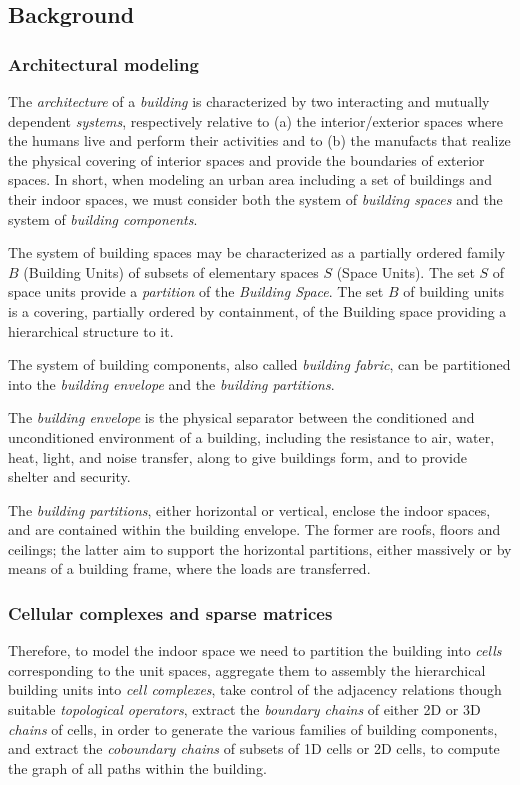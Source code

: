 \documentclass[]{egpubl}
\begin{document}
\subsection{Background}

\subsubsection*{Architectural modeling} 
The \emph{architecture} of a \emph{building} is characterized by two interacting and mutually dependent \emph{systems}, respectively relative to (a) the interior/exterior spaces where the humans live and perform their activities and to (b) the manufacts that realize the physical covering of interior spaces and provide the boundaries of exterior spaces. In short, when modeling an urban area including a set of buildings and their indoor spaces, we must consider both the system of \emph{building spaces} and the system of \emph{building components}.

The system of building spaces may be characterized as a partially ordered family $B$ (Building Units) of subsets of elementary spaces $S$ (Space Units). The set $S$ of space units provide a \emph{partition} of the \emph{Building Space}. The set $B$ of building units is a covering, partially ordered by containment, of the Building space providing a hierarchical structure to it.

The system of building components, also called \emph{building fabric}, can be partitioned into the  \emph{building envelope} and the \emph{building partitions}.

The \emph{building envelope} is the physical separator between the conditioned and unconditioned environment of a building, including the resistance to air, water, heat, light, and noise transfer, along to give buildings form, and to provide shelter and security.

The \emph{building partitions}, either horizontal or vertical, enclose the indoor spaces, and are contained within the building envelope. The former are roofs, floors and ceilings; the latter aim to support the horizontal partitions, either massively or by means of a building frame, where the loads are transferred.

\subsubsection*{Cellular complexes and sparse matrices} 

Therefore, to model the indoor space we need to partition the building into \emph{cells} corresponding to the unit spaces, aggregate them to assembly the hierarchical  building units into \emph{cell complexes}, take control of the adjacency relations though suitable \emph{topological operators}, extract the \emph{boundary chains} of either 2D or 3D \emph{chains} of cells, in order to generate the various families of building components, and extract the \emph{coboundary chains} of subsets of 1D cells or 2D cells, to compute the graph of all paths within the building.
\end{document}
